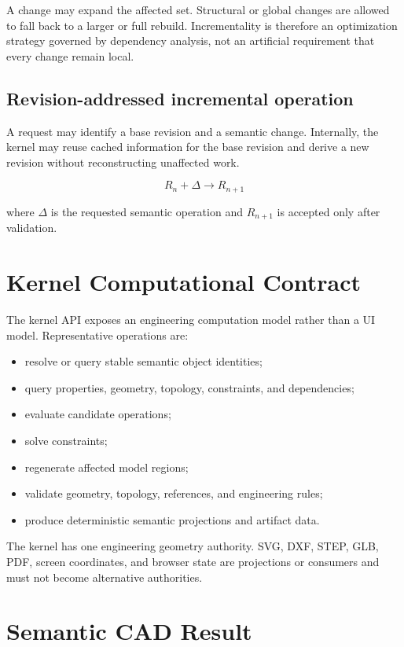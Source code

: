 \documentclass[11pt,a4paper]{article}
\begin{document}
A change may expand the affected set. Structural or global changes are allowed to fall back to a larger or full rebuild. Incrementality is therefore an optimization strategy governed by dependency analysis, not an artificial requirement that every change remain local.

\subsection{Revision-addressed incremental operation}

A request may identify a base revision and a semantic change. Internally, the kernel may reuse cached information for the base revision and derive a new revision without reconstructing unaffected work.

\[
R_{n} + \Delta \rightarrow R_{n+1}
\]

where $\Delta$ is the requested semantic operation and $R_{n+1}$ is accepted only after validation.

\section{Kernel Computational Contract}

The kernel API exposes an engineering computation model rather than a UI model. Representative operations are:
\begin{itemize}
    \item resolve or query stable semantic object identities;
    \item query properties, geometry, topology, constraints, and dependencies;
    \item evaluate candidate operations;
    \item solve constraints;
    \item regenerate affected model regions;
    \item validate geometry, topology, references, and engineering rules;
    \item produce deterministic semantic projections and artifact data.
\end{itemize}

The kernel has one engineering geometry authority. SVG, DXF, STEP, GLB, PDF, screen coordinates, and browser state are projections or consumers and must not become alternative authorities.

\section{Semantic CAD Result}
\end{document}
